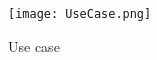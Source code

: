 %
% 

%
%
%

\begin{figure}[htb]
	\centering
	\texttt{[image: UseCase.png]}
	\caption{Use case}
	\label{fig:usecase}
\end{figure}
